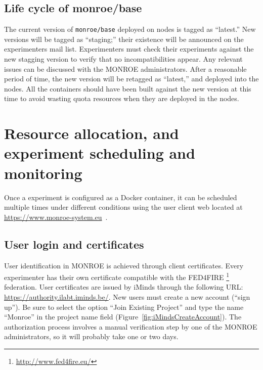 \documentclass[a4paper,10pt]{article}
\newcommand{\monroe}{MONROE}
\newcommand{\identifier}[1]{{\texttt{\small{#1}}}}
\begin{document}
\subsection{Life cycle of monroe/base}

The current version of \identifier{monroe/base} deployed on nodes is tagged as ``latest.''
New versions will be tagged as ``staging;'' their existence will be announced on the experimenters mail list.
Experimenters must check their experiments against the new stagging version to verify that no incompatibilities appear.
Any relevant issues can be discussed with the \monroe{} administrators.
After a reasonable period of time, the new version will be retagged as ``latest,'' and deployed into the nodes.
All the containers should have been built against the new version at this time to avoid wasting quota resources when they are deployed in the nodes.



\section{Resource allocation, and experiment scheduling and monitoring}
\label{sec:allocSchedMonitor}

Once a experiment is configured as a Docker container, it can be scheduled multiple times under different conditions using the user client web located at \url{https://www.monroe-system.eu}~.

\subsection{User login and certificates}
\label{subsec:login}
User identification in \monroe{} is achieved through client certificates.
Every experimenter has their own certificate compatible with the FED4FIRE%
\footnote{\url{http://www.fed4fire.eu/}} %
federation.
User certificates are issued by iMinds through the following URL: \url{https://authority.ilabt.iminds.be/}.
New users must create a new account (``sign up'').
Be sure to select the option ``Join Existing Project'' and type the name ``Monroe'' in the project name field (Figure~\ref{fig:iMindsCreateAccount}).
The authorization process involves a manual verification step by one of the \monroe{} administrators, so it will probably take one or two days.
\end{document}
